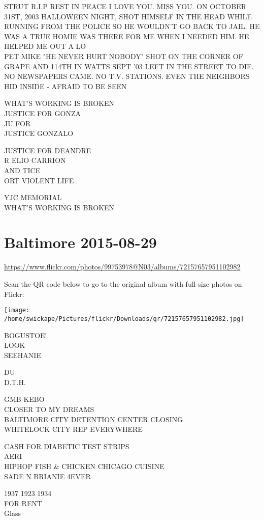 \documentclass[10pt,letterpaper]{article}
\begin{document}
STRUT R.I.P REST IN PEACE I LOVE YOU.  MISS YOU.  ON OCTOBER 31ST, 2003 HALLOWEEN NIGHT, SHOT HIMSELF IN THE HEAD WHILE RUNNING FROM THE POLICE SO HE WOULDN'T GO BACK TO JAIL.  HE WAS A TRUE HOMIE WAS THERE FOR ME WHEN I NEEDED HIM.  HE HELPED ME OUT A LO\\
PET MIKE "HE NEVER HURT NOBODY" SHOT ON THE CORNER OF GRAPE AND 114TH IN WATTS SEPT '03 LEFT IN THE STREET TO DIE.  NO NEWSPAPERS CAME.  NO T.V. STATIONS.  EVEN THE NEIGHBORS HID INSIDE {-} AFRAID TO BE SEEN

WHAT'S WORKING IS BROKEN\\
JUSTICE FOR GONZA\\
JU FOR\\
JUSTICE GONZALO

JUSTICE FOR DEANDRE\\
R ELIO CARRION\\
AND TICE\\
ORT VIOLENT LIFE

YJC MEMORIAL\\
WHAT'S WORKING IS BROKEN


\section*{Baltimore 2015-08-29}

\url{https://www.flickr.com/photos/99753978@N03/albums/72157657951102982}

Scan the QR code below to go to the original album with full-size photos on Flickr:

\texttt{[image: /home/swickape/Pictures/flickr/Downloads/qr/72157657951102982.jpg]}


BOGUSTOE!\\
LOOK\\
SEEHANIE

DU\\
D.T.H.

GMB KEBO\\
CLOSER TO MY DREAMS\\
BALTIMORE CITY DETENTION CENTER CLOSING\\
WHITELOCK CITY REP EVERYWHERE

CASH FOR DIABETIC TEST STRIPS\\
AERI\\
HIPHOP FISH \& CHICKEN CHICAGO CUISINE\\
SADE N BRIANIE 4EVER

1937 1923 1934\\
FOR RENT\\
Glass
\end{document}
